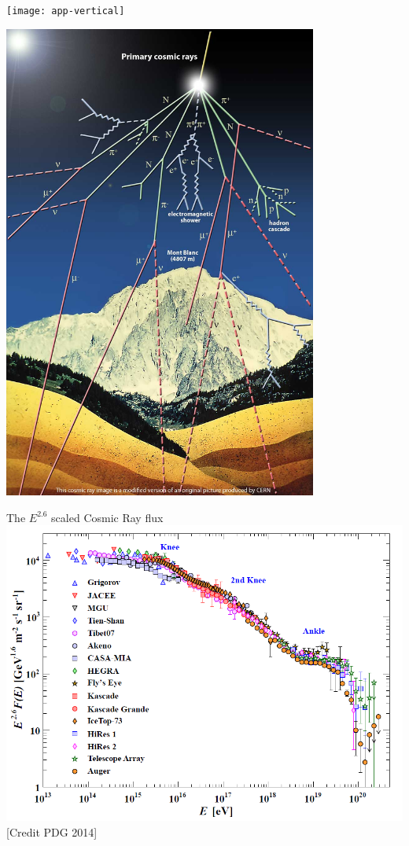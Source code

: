 \Tr
\twocolumn
\begin{center}
\texttt{[image: app-vertical]}
\end{center}

\newpage

\begin{center}
\includegraphics[keepaspectratio,height=15.7cm]{cosray}
\end{center}

\Tr
\twocolumn
\vspace*{2mm}
\begin{center}
{\blue The $E^{2.6}$ scaled Cosmic Ray flux}\\[3mm]
\includegraphics[keepaspectratio,width=14cm]{cr-all-scaled26}\\
{\small [Credit PDG 2014]}
\end{center}

